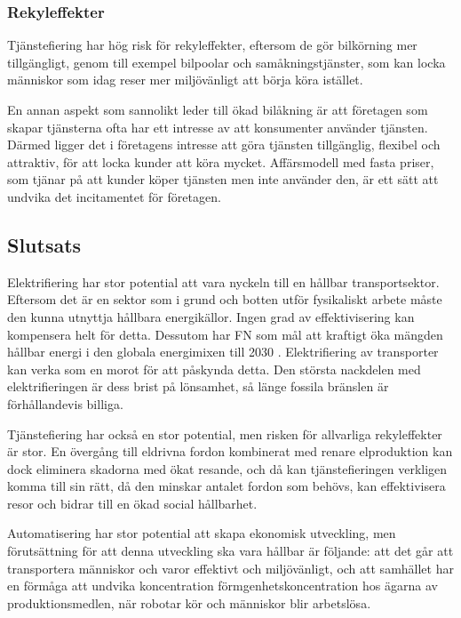 \documentclass{article}
\begin{document}
\subsubsection{Rekyleffekter}

Tjänstefiering har hög risk för rekyleffekter, eftersom de gör bilkörning mer tillgängligt, genom till exempel bilpoolar och samåkningstjänster, som kan locka människor som idag reser mer miljövänligt att börja köra istället.

En annan aspekt som sannolikt leder till ökad bilåkning är att företagen som skapar tjänsterna ofta har ett intresse av att konsumenter använder tjänsten. Därmed ligger det i företagens intresse att göra tjänsten tillgänglig, flexibel och attraktiv, för att locka kunder att köra mycket. Affärsmodell med fasta priser, som tjänar på att kunder köper tjänsten men inte använder den, är ett sätt att undvika det incitamentet för företagen.

\subsection{Slutsats}

Elektrifiering har stor potential att vara nyckeln till en hållbar transportsektor. Eftersom det är en sektor som i grund och botten utför fysikaliskt arbete måste den kunna utnyttja hållbara energikällor. Ingen grad av effektivisering kan kompensera helt för detta. Dessutom har FN som mål att kraftigt öka mängden hållbar energi i den globala energimixen till 2030 . Elektrifiering av transporter kan verka som en morot för att påskynda detta. Den största nackdelen med elektrifieringen är dess brist på lönsamhet, så länge fossila bränslen är förhållandevis billiga.

Tjänstefiering har också en stor potential, men risken för allvarliga rekyleffekter är stor. En övergång till eldrivna fordon kombinerat med renare elproduktion kan dock eliminera skadorna med ökat resande, och då kan tjänstefieringen verkligen komma till sin rätt, då den minskar antalet fordon som behövs, kan effektivisera resor och bidrar till en ökad social hållbarhet.

Automatisering har stor potential att skapa ekonomisk utveckling, men förutsättning för att denna utveckling ska vara hållbar är följande: att det går att transportera människor och varor effektivt och miljövänligt, och att samhället har en förmåga att undvika koncentration förmgenhetskoncentration hos ägarna av produktionsmedlen, när robotar kör och människor blir arbetslösa.
\end{document}
